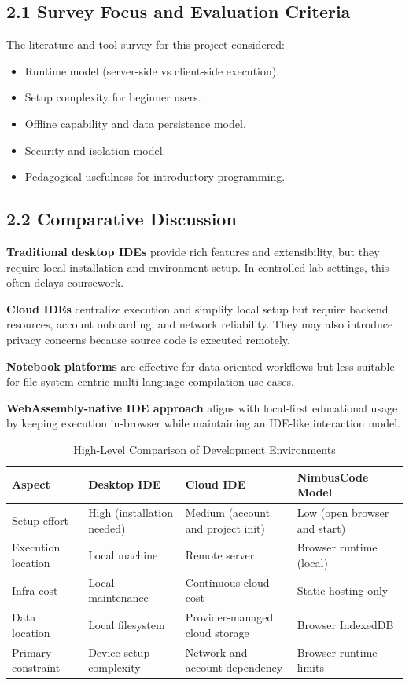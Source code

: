 \subsection*{2.1 Survey Focus and Evaluation Criteria}
The literature and tool survey for this project considered:
\begin{itemize}[leftmargin=8mm]
\item Runtime model (server-side vs client-side execution).
\item Setup complexity for beginner users.
\item Offline capability and data persistence model.
\item Security and isolation model.
\item Pedagogical usefulness for introductory programming.
\end{itemize}

\subsection*{2.2 Comparative Discussion}
\textbf{Traditional desktop IDEs} provide rich features and extensibility, but they require local installation and environment setup. In controlled lab settings, this often delays coursework.

\textbf{Cloud IDEs} centralize execution and simplify local setup but require backend resources, account onboarding, and network reliability. They may also introduce privacy concerns because source code is executed remotely.

\textbf{Notebook platforms} are effective for data-oriented workflows but less suitable for file-system-centric multi-language compilation use cases.

\textbf{WebAssembly-native IDE approach} aligns with local-first educational usage by keeping execution in-browser while maintaining an IDE-like interaction model.

\begin{table}[H]
\centering
\caption{High-Level Comparison of Development Environments}
\begin{tabular}{p{3.3cm}p{3.2cm}p{3.2cm}p{3.2cm}}
\toprule
\textbf{Aspect} & \textbf{Desktop IDE} & \textbf{Cloud IDE} & \textbf{NimbusCode Model} \\
\midrule
Setup effort & High (installation needed) & Medium (account and project init) & Low (open browser and start) \\
Execution location & Local machine & Remote server & Browser runtime (local) \\
Infra cost & Local maintenance & Continuous cloud cost & Static hosting only \\
Data location & Local filesystem & Provider-managed cloud storage & Browser IndexedDB \\
Primary constraint & Device setup complexity & Network and account dependency & Browser runtime limits \\
\bottomrule
\end{tabular}
\end{table}

